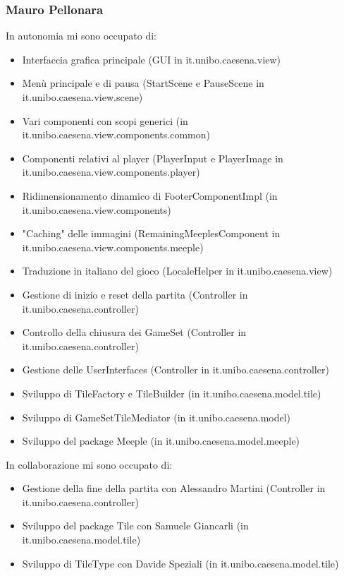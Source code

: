 \subsubsection*{Mauro Pellonara}
In autonomia mi sono occupato di:
\begin{itemize}
    \item Interfaccia grafica principale (GUI in it.unibo.caesena.view)
    \item Menù principale e di pausa (StartScene e PauseScene in it.unibo.caesena.view.scene)
    \item Vari componenti con scopi generici (in it.unibo.caesena.view.components.common)
    \item Componenti relativi al player (PlayerInput e PlayerImage in it.unibo.caesena.view.components.player)
    \item Ridimensionamento dinamico di FooterComponentImpl (in it.unibo.caesena.view.components)
    \item "Caching" delle immagini (RemainingMeeplesComponent in it.unibo.caesena.view.components.meeple)
    \item Traduzione in italiano del gioco (LocaleHelper in it.unibo.caesena.view)
    \item Gestione di inizio e reset della partita (Controller in it.unibo.caesena.controller)
    \item Controllo della chiusura dei GameSet (Controller in it.unibo.caesena.controller)
    \item Gestione delle UserInterfaces (Controller in it.unibo.caesena.controller)
    \item Sviluppo di TileFactory e TileBuilder (in it.unibo.caesena.model.tile)
    \item Sviluppo di GameSetTileMediator (in it.unibo.caesena.model)
    \item Sviluppo del package Meeple (in it.unibo.caesena.model.meeple)
\end{itemize}
In collaborazione mi sono occupato di:
\begin{itemize}
    \item Gestione della fine della partita con Alessandro Martini (Controller in it.unibo.caesena.controller)
    \item Sviluppo del package Tile con Samuele Giancarli (in it.unibo.caesena.model.tile)
    \item Sviluppo di TileType con Davide Speziali (in it.unibo.caesena.model.tile)
\end{itemize}

